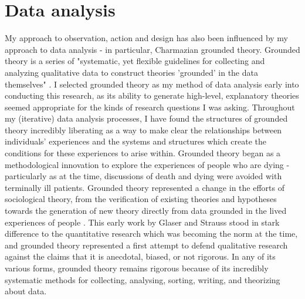 \section{Data analysis}
\label{sec:3-3-analysis}
My approach to observation, action and design has also been influenced by my approach to data analysis - in particular, Charmazian grounded theory. Grounded theory is a series of "systematic, yet flexible guidelines for collecting and analyzing qualitative data to construct theories 'grounded' in the data themselves" \cite[3]{charmaz_constructing_2006}. I selected grounded theory as my method of data analysis early into conducting this research, as its ability to generate high-level, explanatory theories seemed appropriate for the kinds of research questions I was asking. Throughout my (iterative) data analysis processes, I have found the structures of grounded theory incredibly liberating as a way to make clear the relationships between individuals' experiences and the systems and structures which create the conditions for these experiences to arise within. 
Grounded theory began as a methodological innovation to explore the experiences of people who are dying \citep{glaser_awareness_2017} - particularly as at the time, discussions of death and dying were avoided with terminally ill patients. Grounded theory represented a change in the efforts of sociological theory, from the verification of existing theories and hypotheses towards the generation of new theory directly from data grounded in the lived experiences of people \citep{glaser_discovery_2009}. This early work by Glaser and Strauss stood in stark difference to the quantitative research which was becoming the norm at the time, and grounded theory represented a first attempt to defend qualitative research against the claims that it is anecdotal, biased, or not rigorous. In any of its various forms, grounded theory remains rigorous because of its incredibly systematic methods for collecting, analysing, sorting, writing, and theorizing about data. 

